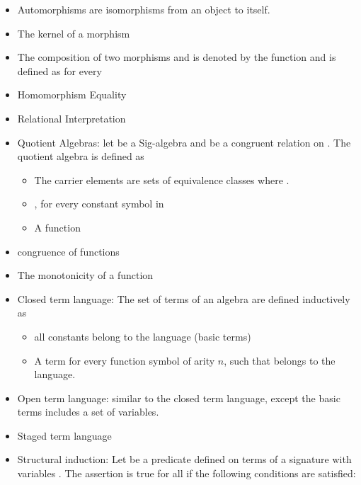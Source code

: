 \begin{itemize}
    \item Automorphisms are isomorphisms from an object to itself. 
    \item The kernel of a morphism 
    \item The composition of two morphisms  and  is denoted by the function  and is defined as 
     for every    
    \item Homomorphism Equality 
    \item Relational Interpretation 
    \item Quotient Algebras: let  be a Sig-algebra and  be a congruent relation on . The quotient algebra  is defined as
    \begin{itemize}
       \item The carrier elements are sets of equivalence classes  where . 
       \item {}, for every constant symbol  in 
       \item A function   
    \end{itemize}      
    \item congruence of functions 
    \item The monotonicity of a function 
    \item Closed term language:  The set of terms of an algebra are defined inductively as 
    \begin{itemize}
        \item all constants belong to the language (basic terms) 
        \item A term  for every function symbol  of arity $n$, such that   belongs to the language. 
    \end{itemize}
    \item Open term language: similar to the closed term language, except the basic terms includes a set of variables.  
    \item Staged term language 
    \item Structural induction: Let  be a predicate defined on terms  of a signature  with variables . The assertion  is true for all  if the following conditions are satisfied: 

\end{itemize}
